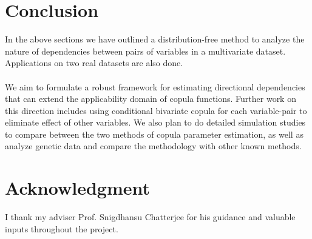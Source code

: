 \documentclass[11pt]{llncs}
\begin{document}
\section{Conclusion}In the above sections we have outlined a distribution-free method to analyze the nature of dependencies between pairs of variables in a multivariate dataset. Applications on two real datasets are also done.

\paragraph{}We aim to formulate a robust framework for estimating directional dependencies that can extend the applicability domain of copula functions. Further work on this direction includes using conditional bivariate copula for each variable-pair to eliminate effect of other variables. We also plan to do detailed simulation studies to compare between the two methods of copula parameter estimation, as well as analyze genetic data and compare the methodology with other known methods.

\section*{Acknowledgment}I thank my adviser Prof. Snigdhansu Chatterjee for his guidance and valuable inputs throughout the project.




\newpage
\end{document}
